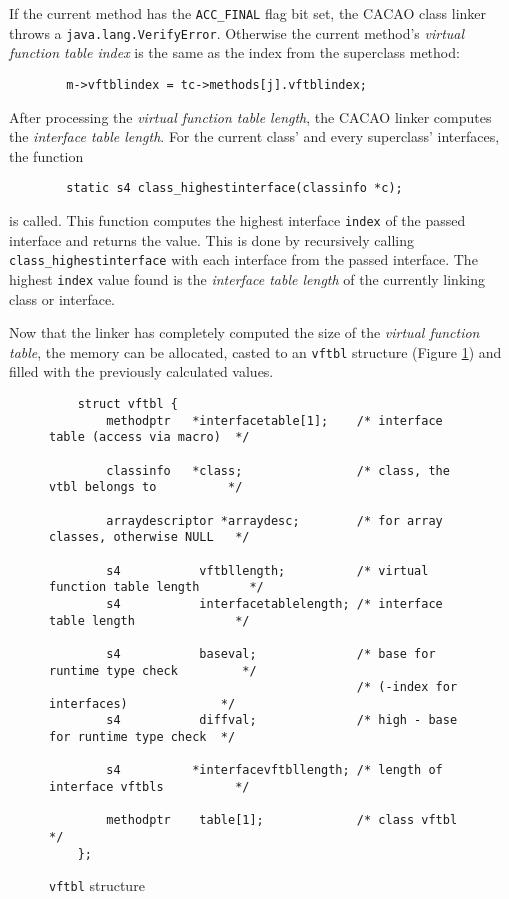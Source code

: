 If the current method has the \texttt{ACC\_FINAL} flag bit set, the
CACAO class linker throws a \texttt{java.lang.VerifyError}. Otherwise
the current method's \textit{virtual function table index} is the same
as the index from the superclass method:

\begin{verbatim}
        m->vftblindex = tc->methods[j].vftblindex;
\end{verbatim}

After processing the \textit{virtual function table length}, the CACAO
linker computes the \textit{interface table length}. For the current
class' and every superclass' interfaces, the function

\begin{verbatim}
        static s4 class_highestinterface(classinfo *c);
\end{verbatim}

is called. This function computes the highest interface \texttt{index}
of the passed interface and returns the value. This is done by
recursively calling \texttt{class\_highestinterface} with each
interface from the passed interface. The highest \texttt{index} value
found is the \textit{interface table length} of the currently linking
class or interface.

Now that the linker has completely computed the size of the
\textit{virtual function table}, the memory can be allocated, casted
to an \texttt{vftbl} structure (Figure \ref{vftblstructure}) and
filled with the previously calculated values.

\begin{figure}
\begin{verbatim}
    struct vftbl {
        methodptr   *interfacetable[1];    /* interface table (access via macro)  */

        classinfo   *class;                /* class, the vtbl belongs to          */

        arraydescriptor *arraydesc;        /* for array classes, otherwise NULL   */

        s4           vftbllength;          /* virtual function table length       */
        s4           interfacetablelength; /* interface table length              */

        s4           baseval;              /* base for runtime type check         */
                                           /* (-index for interfaces)             */
        s4           diffval;              /* high - base for runtime type check  */

        s4          *interfacevftbllength; /* length of interface vftbls          */
	
        methodptr    table[1];             /* class vftbl                         */
    };
\end{verbatim}
\caption{\texttt{vftbl} structure}
\label{vftblstructure}
\end{figure}

